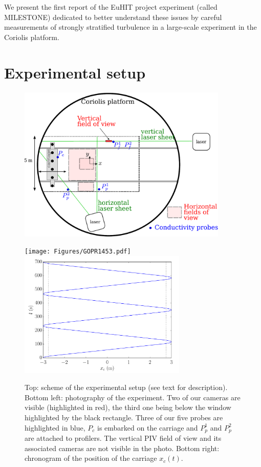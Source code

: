 \noindent We present the first report of the EuHIT project experiment (called
MILESTONE) dedicated to better understand these issues by careful measurements
of strongly stratified turbulence in a large-scale experiment in the Coriolis
platform.


\section{Experimental setup}

\begin{figure}[htb]
\centerline{
\includegraphics[width=10cm]{Figures/scheme_exp_grid_MILESTONE_Euhit.pdf}}
\vspace{5mm}
\centerline{
\texttt{[image: Figures/GOPR1453.pdf]}
\includegraphics[width=80mm]{Figures/fig_movement_carriage.pdf}}
\caption{Top: scheme of the experimental setup (see text for
description). Bottom left: photography of the experiment. Two of our cameras
are visible (highlighted in red), the third one being below the window
highlighted by the black rectangle. Three of our five probes are highlighted in
blue, $P_c$ is embarked on the carriage and $P_p^1$ and $P_p^2$ are attached to
profilers. The vertical PIV field of view and its associated cameras are not
visible in the photo. Bottom right: chronogram of the position of the carriage
$x_c(t)$.}
\label{fig:exp}
\end{figure}

